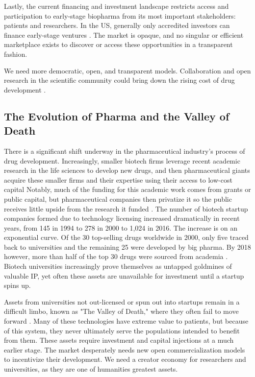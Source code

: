 \documentclass[12pt,letterpaper]{article}
\begin{document}
Lastly, the current financing and investment landscape restricts access and participation to early-stage biopharma from its most important stakeholders: patients and researchers. In the US, generally only accredited investors can finance early-stage ventures \citep{Rowley2018}. The market is opaque, and no singular or efficient marketplace exists to discover or access these opportunities in a transparent fashion.

We need more democratic, open, and transparent models. Collaboration and open research in the scientific community could bring down the rising cost of drug development \citep{Bookbinder2020}.

\subsection{The Evolution of Pharma and the Valley of Death}
There is a significant shift underway in the pharmaceutical industry's process of drug development. Increasingly, smaller biotech firms leverage recent academic research in the life sciences to develop new drugs, and then pharmaceutical giants acquire these smaller firms and their expertise using their access to low-cost capital \citep{Huang2021} Notably, much of the funding for this academic work comes from grants or public capital, but  pharmaceutical companies then privatize it so the public receives little upside from the research it funded \citep{Toole2004}. The number of biotech startup companies formed due to technology licensing increased dramatically in recent years, from 145 in 1994 to 278 in 2000 to 1,024 in 2016. The increase is on an exponential curve. Of the 30 top-selling drugs worldwide in 2000, only five traced back to universities and the remaining 25 were developed by big pharma. By 2018 however, more than half of the top 30 drugs were sourced from academia \citep{Huang2021}. Biotech universities increasingly prove themselves as untapped goldmines of valuable IP, yet often these assets are unavailable for investment until a startup spins up. 

Assets from universities not out-licensed or spun out into startups remain in a difficult limbo, known as "The Valley of Death," where they often fail to move forward \citep{Seyhan2019}. Many of these technologies have extreme value to patients, but because of this system, they never ultimately serve the populations intended to benefit from them. These assets require investment and capital injections at a much earlier stage. The market desperately needs new open commercialization models to incentivize their development. We need a creator economy for researchers and universities, as they are one of humanities greatest assets. 
\end{document}
